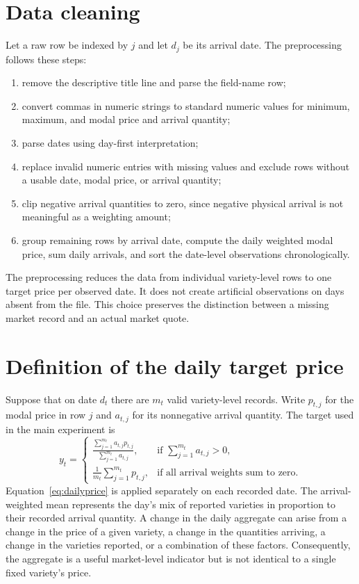 \documentclass[12pt,a4paper,oneside]{report}
\numberwithin{equation}{chapter}
\numberwithin{figure}{chapter}
\numberwithin{table}{chapter}
\theoremstyle{definition}
\theoremstyle{plain}
\newcommand{\1}{\mathbf{1}}
\begin{document}
\section{Data cleaning}
Let a raw row be indexed by $j$ and let $d_j$ be its arrival date. The preprocessing follows these steps:
\begin{enumerate}
  \item remove the descriptive title line and parse the field-name row;
  \item convert commas in numeric strings to standard numeric values for minimum, maximum, and modal price and arrival quantity;
  \item parse dates using day-first interpretation;
  \item replace invalid numeric entries with missing values and exclude rows without a usable date, modal price, or arrival quantity;
  \item clip negative arrival quantities to zero, since negative physical arrival is not meaningful as a weighting amount;
  \item group remaining rows by arrival date, compute the daily weighted modal price, sum daily arrivals, and sort the date-level observations chronologically.
\end{enumerate}

The preprocessing reduces the data from individual variety-level rows to one target price per observed date. It does not create artificial observations on days absent from the file. This choice preserves the distinction between a missing market record and an actual market quote.

\section{Definition of the daily target price}
Suppose that on date $d_t$ there are $m_t$ valid variety-level records. Write $p_{t,j}$ for the modal price in row $j$ and $a_{t,j}$ for its nonnegative arrival quantity. The target used in the main experiment is
\begin{equation}
  y_t=\begin{cases}
  \displaystyle\frac{\sum_{j=1}^{m_t}a_{t,j}p_{t,j}}
  {\sum_{j=1}^{m_t}a_{t,j}}, & \text{if }\sum_{j=1}^{m_t}a_{t,j}>0,\\[1.2em]
  \displaystyle\frac{1}{m_t}\sum_{j=1}^{m_t}p_{t,j}, & \text{if all arrival weights sum to zero.}
  \end{cases}
  \label{eq:dailyprice}
\end{equation}
Equation~\eqref{eq:dailyprice} is applied separately on each recorded date. The arrival-weighted mean represents the day's mix of reported varieties in proportion to their recorded arrival quantity. A change in the daily aggregate can arise from a change in the price of a given variety, a change in the quantities arriving, a change in the varieties reported, or a combination of these factors. Consequently, the aggregate is a useful market-level indicator but is not identical to a single fixed variety's price.
\end{document}
